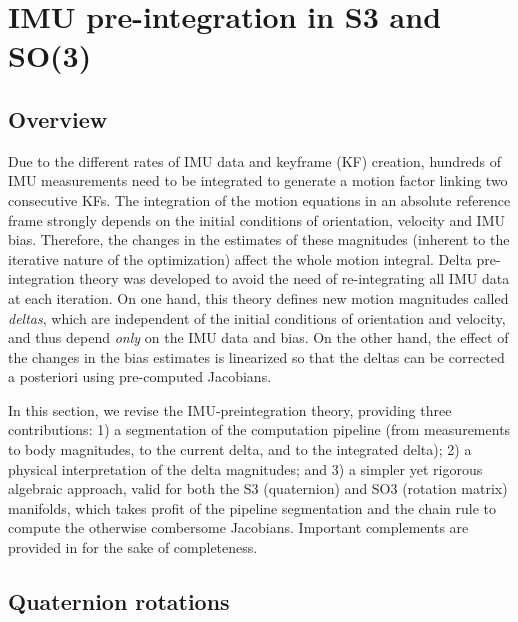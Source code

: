 




\section{IMU pre-integration in S3 and SO(3)}
\label{sec:imu}

\subsection{Overview}

Due to the different rates of IMU data and keyframe (KF) creation, hundreds of IMU measurements need to be integrated to generate a motion factor linking two consecutive KFs. 
The integration of the motion equations in an absolute reference frame strongly depends on the initial conditions of orientation, velocity and IMU bias.
Therefore, the changes in the estimates of these magnitudes (inherent to the iterative nature of the optimization) affect the whole motion integral. 
Delta pre-integration theory was developed \cite{LUPTON-09,forster2015imu} to avoid the need of re-integrating all IMU data at each iteration. 
On one hand, this theory defines new motion magnitudes called \emph{deltas}, which are independent of the initial conditions of orientation and velocity, and thus depend \emph{only} on the IMU data and bias. 
On the other hand, the effect of the changes in the bias estimates is linearized so that the deltas can be corrected a posteriori using pre-computed Jacobians. 

In this section, we revise the IMU-preintegration theory, providing three contributions: 
1) a segmentation of the computation pipeline (from measurements to body magnitudes, to the current delta, and to the integrated delta); 
2) a physical interpretation of the delta magnitudes; 
and 
3) a simpler yet rigorous algebraic approach, valid for both the S3 (quaternion) and SO3 (rotation matrix) manifolds, which takes profit of the pipeline segmentation and the chain rule to compute the otherwise combersome \cite{forster2015imu} Jacobians. 
Important complements are provided in  for the sake of completeness.

\subsection{Quaternion rotations}

